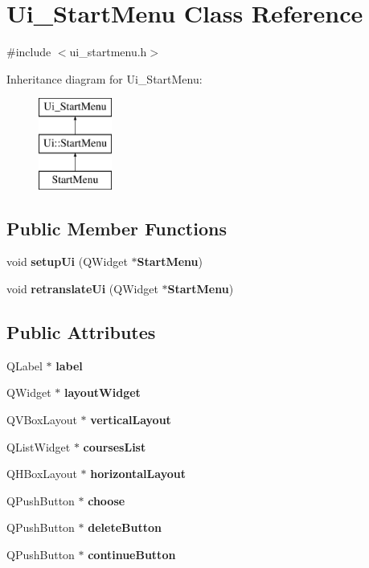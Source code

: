 \section{Ui\-\_\-\-Start\-Menu Class Reference}
\label{class_ui___start_menu}


{\ttfamily \#include $<$ui\-\_\-startmenu.\-h$>$}

Inheritance diagram for Ui\-\_\-\-Start\-Menu\-:\begin{figure}[H]
\begin{center}
\leavevmode
\includegraphics[height=3.000000cm]{class_ui___start_menu}
\end{center}
\end{figure}
\subsection*{Public Member Functions}
\begin{DoxyCompactItemize}
\item 
void {\bf setup\-Ui} (Q\-Widget $\ast${\bf Start\-Menu})
\item 
void {\bf retranslate\-Ui} (Q\-Widget $\ast${\bf Start\-Menu})
\end{DoxyCompactItemize}
\subsection*{Public Attributes}
\begin{DoxyCompactItemize}
\item 
Q\-Label $\ast$ {\bf label}
\item 
Q\-Widget $\ast$ {\bf layout\-Widget}
\item 
Q\-V\-Box\-Layout $\ast$ {\bf vertical\-Layout}
\item 
Q\-List\-Widget $\ast$ {\bf courses\-List}
\item 
Q\-H\-Box\-Layout $\ast$ {\bf horizontal\-Layout}
\item 
Q\-Push\-Button $\ast$ {\bf choose}
\item 
Q\-Push\-Button $\ast$ {\bf delete\-Button}
\item 
Q\-Push\-Button $\ast$ {\bf continue\-Button}
\end{DoxyCompactItemize}


